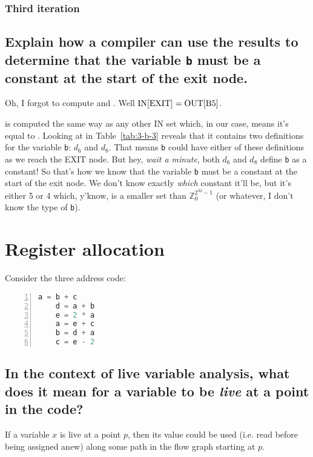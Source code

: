 

\subsubsection{Third iteration}
\renewcommand{\INBone}		{$\{d_4,~ d_6,~ d_7,~ d_8,~ d_9,~ d_{10},~ d_{12}\}$}
\renewcommand{\OUTBone}		{$\{d_1,~ d_2,~ d_3,~ d_4,~ d_7,~ d_9\}$}




\subsection{Explain how a compiler can use the results to determine that the variable \texttt{b} must be a constant at the start of the exit node.}
Oh, I forgot to compute  and .
Well $\text{IN[EXIT]} = \text{OUT[B5]}$.

 is computed the same way as any other IN set which, in our case, means it's equal to .
Looking at  in Table~\ref{tab:3-b-3} reveals that it contains two definitions for the variable \texttt{b}: $d_6$ and $d_8$.
That means \texttt{b} could have either of these definitions as we reach the EXIT node.
But hey, \emph{wait a minute}, both $d_6$ and $d_8$ define \texttt{b} as a constant!
So that's how we know that the variable \texttt{b} must be a constant at the start of the exit node.
We don't know exactly \emph{which} constant it'll be, but it's either 5 or 4 which, y'know, is a smaller set than $\mathbb{Z}_{0}^{2^{32}-1}$ (or whatever, I don't know the type of \texttt{b}).


\section{Register allocation}
Consider the three address code:
\begin{lstlisting}[language=C, tabsize=2, basicstyle=\ttfamily\small, numbers=left, numberstyle=\small\color{gray}]
	a = b + c
	d = a + b
	e = 2 * a
	a = e + c
	b = d + a
	c = e - 2
\end{lstlisting}

\subsection{In the context of live variable analysis, what does it mean for a variable to be \emph{live} at a point in the code?}
If a variable $x$ is live at a point $p$, then its value could be used (i.e. read before being assigned anew) along some path in the flow graph starting at $p$.

